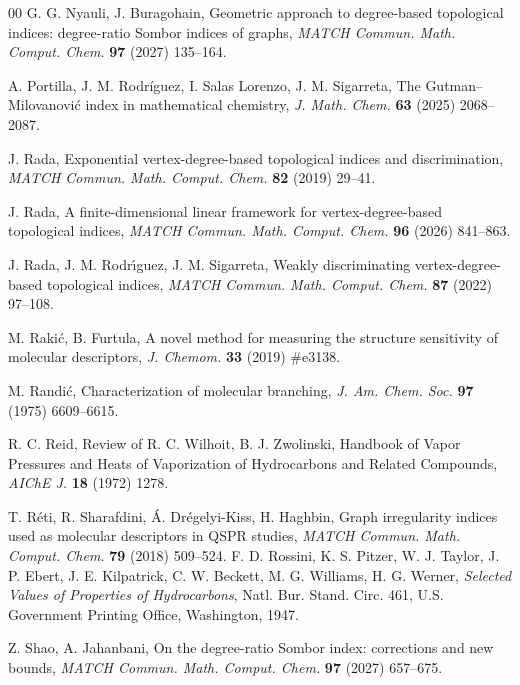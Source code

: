 \documentclass[a5paper, 10pt]{article}
\theoremstyle{plain}
\theoremstyle{remark}
\theoremstyle{definition}
\begin{document}
\begin{thebibliography}{00}
   G. G. Nyauli, J. Buragohain,
  Geometric approach to degree-based topological indices: degree-ratio
  Sombor indices of graphs, \textit{MATCH Commun. Math. Comput. Chem.\/}
  \textbf{97} (2027) 135--164.

   A. Portilla, J. M. Rodr\'iguez,
  I. Salas Lorenzo, J. M. Sigarreta, The Gutman--Milovanovi\'c index
  in mathematical chemistry, \textit{J. Math. Chem.\/} \textbf{63}
  (2025) 2068--2087.

   J. Rada, Exponential vertex-degree-based
  topological indices and discrimination, \textit{MATCH Commun. Math.
  Comput. Chem.\/} \textbf{82} (2019) 29--41.

   J. Rada, A finite-dimensional linear
  framework for vertex-degree-based topological indices, \textit{MATCH
  Commun. Math. Comput. Chem.\/} \textbf{96} (2026) 841--863.

   J. Rada, J. M. Rodr\'{\i}guez,
  J. M. Sigarreta, Weakly discriminating vertex-degree-based topological
  indices, \textit{MATCH Commun. Math. Comput. Chem.\/} \textbf{87} (2022)
  97--108.

   M. Raki\'c, B. Furtula, A novel method for
  measuring the structure sensitivity of molecular descriptors, \textit{J. Chemom.\/} \textbf{33} (2019) \#e3138.

   M. Randi\'c, Characterization of molecular
  branching, \textit{J. Am. Chem. Soc.\/} \textbf{97} (1975) 6609--6615.

   R. C. Reid, Review of R. C. Wilhoit, B. J. Zwolinski, Handbook
  of Vapor Pressures and Heats of Vaporization of Hydrocarbons and Related
  Compounds, \textit{AIChE J.\/} \textbf{18} (1972) 1278.

   T. R\'eti, R. Sharafdini,
  \'A. Dr\'egelyi-Kiss, H. Haghbin, Graph irregularity indices used as
  molecular descriptors in QSPR studies, \textit{MATCH Commun. Math.
  Comput. Chem.\/} \textbf{79} (2018) 509--524.
   F. D. Rossini, K. S. Pitzer, W. J. Taylor,
  J. P. Ebert, J. E. Kilpatrick, C. W. Beckett, M. G. Williams, H. G. Werner,
  \textit{Selected Values of Properties of Hydrocarbons\/}, Natl. Bur.
  Stand. Circ. 461, U.S. Government Printing Office, Washington, 1947.

   Z. Shao, A. Jahanbani, On the degree-ratio Sombor
  index: corrections and new bounds, \textit{MATCH Commun. Math. Comput.
  Chem.\/} \textbf{97} (2027) 657--675.


\end{thebibliography}
\end{document}
